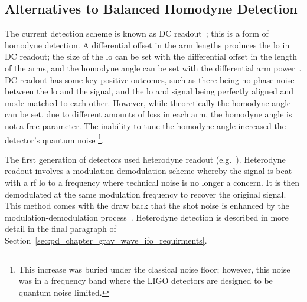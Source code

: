 \subsection{Alternatives to Balanced Homodyne Detection}
\label{sec:BHD_for_ligo_alternatives}
The current detection scheme is known as DC readout~\cite{Fricke2012}; this is a form of homodyne detection. A differential offset in the arm lengths produces the \gls{lo} in DC readout; the size of the \gls{lo} can be set with the differential offset in the length of the arms, and the homodyne angle can be set with the differential arm power~\cite{Fritschel2014}. DC readout has some key positive outcomes, such as there being no phase noise between the \gls{lo} and the signal, and the \gls{lo} and signal being perfectly aligned and mode matched to each other. However, while theoretically the homodyne angle can be set, due to different amounts of loss in each arm, the homodyne angle is not a free parameter. The inability to tune the homodyne angle increased the detector's quantum noise \footnote{This increase was buried under the classical noise floor; however, this noise was in a frequency band where the LIGO detectors are designed to be quantum noise limited.}. 
\par
The first generation of detectors used heterodyne readout (e.g.~\cite{Sigg2008}). Heterodyne readout involves a modulation-demodulation scheme whereby the signal is beat with a \gls{rf} \gls{lo} to a frequency where technical noise is no longer a concern. It is then demodulated at the same modulation frequency to recover the original signal. This method comes with the draw back that the shot noise is enhanced by the modulation-demodulation process~\cite{Meers1991}. Heterodyne detection is described in more detail in the final paragraph of Section~\ref{sec:pd_chapter_grav_wave_ifo_requirments}.
